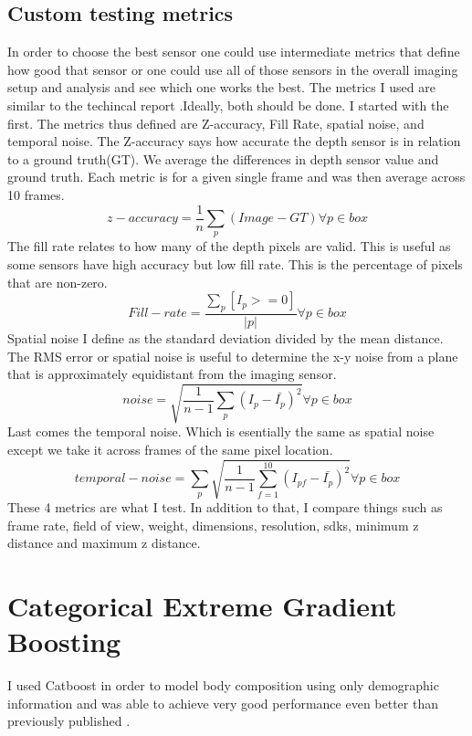 \subsection{Custom testing metrics}
In order to choose the best sensor one could use intermediate metrics that define how good that sensor or one could use all of those sensors in the overall imaging setup and analysis and see which one works the best. The metrics I used are similar to the techincal report \cite{depthtesting}.Ideally, both should be done. I started with the first. The metrics thus defined are Z-accuracy, Fill Rate, spatial noise, and temporal noise. The Z-accuracy says how accurate the depth sensor is in relation to a ground truth(GT). We average the differences in depth sensor value and ground truth. Each metric is for a given single frame and was then average across 10 frames.
\begin{equation}
	z-accuracy = \frac{1}{n}\sum_p(Image - GT) \forall p \in box
\end{equation}
The fill rate relates to how many of the depth pixels are valid. This is useful as some sensors have high accuracy but low fill rate. This is the percentage of pixels that are non-zero.
\begin{equation}
	Fill-rate = \frac{\sum_p[I_p >= 0]}{\vert p \vert} \forall p \in box
\end{equation}
Spatial noise I define as the standard deviation divided by the mean distance.
The RMS error or spatial noise is useful to determine the x-y noise from a plane that is approximately equidistant from the imaging sensor.
\begin{equation}
	noise = \sqrt{\frac{1}{n-1}\sum_p(I_p-{\bar{I_p}})^2} \forall p \in box
\end{equation}
Last comes the temporal noise. Which is esentially the same as spatial noise except we take it across frames of the same pixel location.
\begin{equation}
	temporal-noise = \sum_p\sqrt{\frac{1}{n-1}\sum_{f=1}^{10}(I_{pf}-\bar{I_p})^2} \forall p \in box
\end{equation}
These 4 metrics are what I test. In addition to that, I compare things such as frame rate, field of view, weight, dimensions, resolution, sdks, minimum z distance and maximum z distance.

\section{Categorical Extreme Gradient Boosting}
I used Catboost \cite{DBLP:journals/corr/DorogushGGKPV17} in order to model body composition using only demographic information and was able to achieve very good performance even better than previously published \cite{article} .

